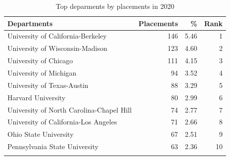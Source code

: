 \documentclass{article}
\begin{document}
\begin{appendix}
\begin{table}[ht]
\centering
\caption{Top deparments by placements in 2020}
\begin{tabular}{lrrr}
  \hline
Departments & Placements & \% & Rank \\
  \hline
University of California-Berkeley & 146 & 5.46 &   1 \\
  University of Wisconsin-Madison & 123 & 4.60 &   2 \\
  University of Chicago & 111 & 4.15 &   3 \\
  University of Michigan &  94 & 3.52 &   4 \\
  University of Texas-Austin &  88 & 3.29 &   5 \\
  Harvard University &  80 & 2.99 &   6 \\
  University of North Carolina-Chapel Hill &  74 & 2.77 &   7 \\
  University of California-Los Angeles &  71 & 2.66 &   8 \\
  Ohio State University &  67 & 2.51 &   9 \\
  Pennsylvania State University &  63 & 2.36 &  10 \\
   \hline
   \label{tab:top_dept_by_placement}
\end{tabular}
\end{table}


\end{appendix}

\bigskip
\end{document}

